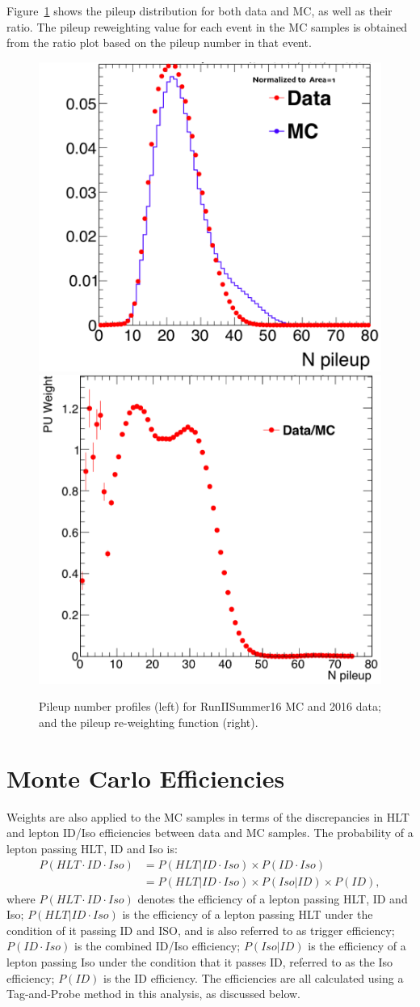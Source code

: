 \vspace{0.3cm}
Figure~\ref{fig:bg_pileup} shows the pileup distribution for both data and MC, as well as their ratio. The pileup reweighting value for each event in the MC samples is obtained from the ratio plot based on the pileup number in that event.

\begin{figure}[htbp]
\begin{center}
\includegraphics[width=0.45\linewidth]{figures/bg_Npileup.png}
\includegraphics[width=0.45\linewidth]{figures/bg_pileupratio.png}
\caption{Pileup number profiles (left) for RunIISummer16 MC and 2016 data; and the pileup re-weighting function (right).}
\label{fig:bg_pileup}
\end{center}
\end{figure}

\section{Monte Carlo Efficiencies}
Weights are also applied to the MC samples in terms of the discrepancies in HLT and lepton ID/Iso efficiencies between data and MC samples. The probability of a lepton passing HLT, ID and Iso is:
\begin{align*}
P(HLT\cdot ID\cdot Iso) & = P(HLT|ID\cdot Iso)\times P(ID\cdot Iso) \\
 & = P(HLT|ID\cdot Iso)\times P(Iso|ID)\times P(ID),
\end{align*}
where $P(HLT\cdot ID\cdot Iso)$ denotes the efficiency of a lepton passing HLT, ID and Iso; $P(HLT|ID\cdot Iso)$ is the efficiency of a lepton passing HLT under the condition of it passing ID and ISO, and is also referred to as trigger efficiency; $P(ID\cdot Iso)$ is the combined ID/Iso efficiency; $P(Iso|ID)$ is the efficiency of a lepton passing Iso under the condition that it passes ID, referred to as the Iso efficiency; $P(ID)$ is the ID efficiency. The efficiencies are all calculated using a Tag-and-Probe method in this analysis, as discussed below. 

